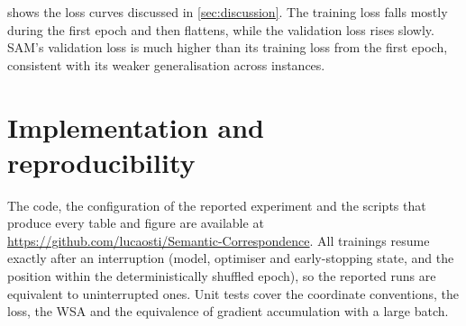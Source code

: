  shows the loss curves discussed in \cref{sec:discussion}. The training loss falls mostly during the first epoch and then flattens, while the validation loss rises slowly. SAM's validation loss is much higher than its training loss from the first epoch, consistent with its weaker generalisation across instances.

\section{Implementation and reproducibility}
The code, the configuration of the reported experiment and the scripts that produce every table and figure are available at \url{https://github.com/lucaosti/Semantic-Correspondence}. All trainings resume exactly after an interruption (model, optimiser and early-stopping state, and the position within the deterministically shuffled epoch), so the reported runs are equivalent to uninterrupted ones. Unit tests cover the coordinate conventions, the loss, the WSA and the equivalence of gradient accumulation with a large batch.
